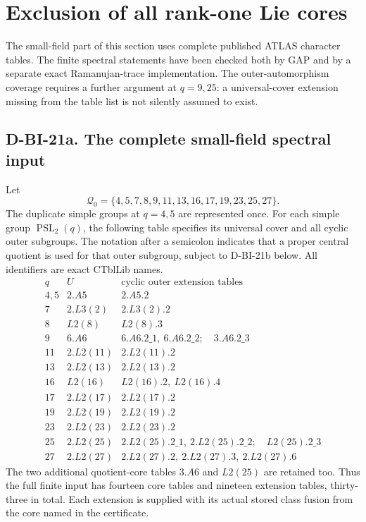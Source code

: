 \section{Exclusion of all rank-one Lie cores}
\label{sec:a1-core}

The small-field part of this section uses complete published ATLAS
character tables.  The finite spectral statements have been checked
both by GAP and by a separate exact Ramanujan-trace implementation.
The outer-automorphism coverage requires a further argument at
$q=9,25$: a universal-cover extension missing from the table list
is not silently assumed to exist.

\subsection*{D-BI-21a. The complete small-field spectral input}

Let
\[
 \mathcal Q_0=\{4,5,7,8,9,11,13,16,17,19,23,25,27\}.
\]
The duplicate simple groups at $q=4,5$ are represented once.
For each simple group $\operatorname{PSL}_2(q)$, the following
table specifies its universal cover and all cyclic outer subgroups.
The notation after a semicolon indicates that a proper central
quotient is used for that outer subgroup, subject to D-BI-21b below.
All identifiers are exact CTblLib names.
\[
\begin{array}{c|l|l}
q&U&\text{cyclic outer extension tables}\\\hline
4,5&2.A5&2.A5.2\\
7&2.L3(2)&2.L3(2).2\\
8&L2(8)&L2(8).3\\
9&6.A6&6.A6.2\_1,\ 6.A6.2\_2;\quad3.A6.2\_3\\
11&2.L2(11)&2.L2(11).2\\
13&2.L2(13)&2.L2(13).2\\
16&L2(16)&L2(16).2,\ L2(16).4\\
17&2.L2(17)&2.L2(17).2\\
19&2.L2(19)&2.L2(19).2\\
23&2.L2(23)&2.L2(23).2\\
25&2.L2(25)&2.L2(25).2\_1,\ 2.L2(25).2\_2;
                    \quad L2(25).2\_3\\
27&2.L2(27)&2.L2(27).2,\ 2.L2(27).3,\ 2.L2(27).6
\end{array}                                                   \tag{BI.78}
\]
The two additional quotient-core tables $3.A6$ and $L2(25)$
are retained too.  Thus the full finite input has fourteen core
tables and nineteen extension tables, thirty-three in total.
Each extension is supplied with its actual stored class fusion
from the core named in the certificate.

